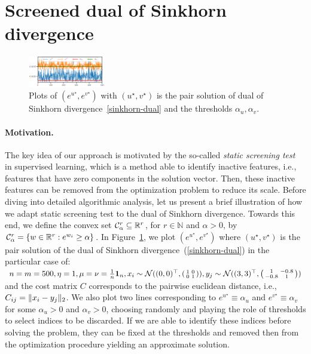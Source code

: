 
\section{Screened dual of Sinkhorn divergence} %
\label{sec:screened_dual_of_sinkhorn_divergence}

\begin{figure}
\vspace{-15pt}
\centering
\includegraphics[width=0.3\textwidth]{./figs/motivations.pdf}
\caption{Plots of $(e^{u^\star}, e^{v^\star})$ with $(u^\star, v^\star)$ is the pair solution of dual of Sinkhorn divergence~\eqref{sinkhorn-dual} and the thresholds $\alpha_u, \alpha_v$.}
\label{fig:motivations}
\vspace{-11pt}
\end{figure}

\paragraph{Motivation.} 

The key idea of our approach is motivated by the so-called \emph{static screening test}~\citep{Ghaoui2010SafeFE} in supervised learning, which is a method able to  identify inactive features, i.e., features that have zero components in the solution vector. 
Then, these inactive features can be removed from the optimization problem to reduce its scale.
Before diving into detailed algorithmic analysis, let us present a brief illustration of how we adapt static screening test to the dual of Sinkhorn divergence.
Towards this end, we define the convex set $\mathcal{C}^r_{\alpha} \subseteq {\mathbb{R}}^r$, for $r\in \mathbb N$ and $\alpha >0$, by $\mathcal{C}^r_{\alpha} = \{w\in {\mathbb{R}}^{r}:  e^{w_i} \geq \alpha\}$.
In Figure~\ref{fig:motivations}, we plot $(e^{u^\star}, e^{v^\star})$ where $(u^\star, v^\star)$ is the pair solution of the dual of Sinkhorn divergence~(\ref{sinkhorn-dual}) in the particular case of: $n=m=500, \eta=1, \mu = \nu = \frac 1n \mathbf 1_n, x_i \sim\mathcal{N}((0,0)^\top, \begin{psmallmatrix}1 & 0\\0 & 1\end{psmallmatrix}), y_j \sim\mathcal{N}((3,3)^\top, \begin{psmallmatrix}1 &-0.8 \\ -0.8 &1 \end{psmallmatrix})$ and the cost matrix $C$ corresponds to the pairwise euclidean distance, i.e., $C_{ij} = \|x_i - y_j\|_2$. 
We also plot two lines corresponding to $e^{u^\star} \equiv \alpha_u$ and $e^{v^\star} \equiv \alpha_v$ for some $\alpha_u>0$ and $\alpha_v >0$, choosing randomly and playing the role of thresholds to select indices to be discarded. {If we are able to identify these indices before solving the problem, they can be fixed at the thresholds and removed then from the optimization procedure yielding an approximate solution.}

